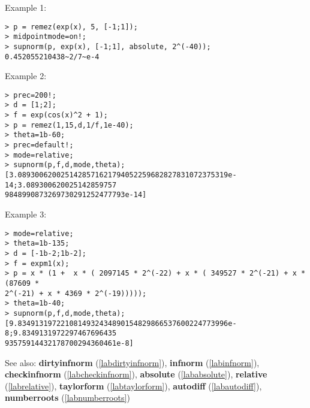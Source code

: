 \noindent Example 1: 
\begin{center}\begin{minipage}{15cm}\begin{Verbatim}[frame=single]
> p = remez(exp(x), 5, [-1;1]);
> midpointmode=on!;
> supnorm(p, exp(x), [-1;1], absolute, 2^(-40));
0.452055210438~2/7~e-4
\end{Verbatim}
\end{minipage}\end{center}
\noindent Example 2: 
\begin{center}\begin{minipage}{15cm}\begin{Verbatim}[frame=single]
> prec=200!;
> d = [1;2];
> f = exp(cos(x)^2 + 1);
> p = remez(1,15,d,1/f,1e-40);
> theta=1b-60;
> prec=default!;
> mode=relative;
> supnorm(p,f,d,mode,theta);
[3.0893006200251428571621794052259682827831072375319e-14;3.089300620025142859757
9848990873269730291252477793e-14]
\end{Verbatim}
\end{minipage}\end{center}
\noindent Example 3: 
\begin{center}\begin{minipage}{15cm}\begin{Verbatim}[frame=single]
> mode=relative;
> theta=1b-135;
> d = [-1b-2;1b-2];
> f = expm1(x);
> p = x * (1 +  x * ( 2097145 * 2^(-22) + x * ( 349527 * 2^(-21) + x * (87609 * 
2^(-21) + x * 4369 * 2^(-19))))); 
> theta=1b-40;
> supnorm(p,f,d,mode,theta);
[9.8349131972210814932434890154829866537600224773996e-8;9.8349131972297467696435
93575914432178700294360461e-8]
\end{Verbatim}
\end{minipage}\end{center}
See also: \textbf{dirtyinfnorm} (\ref{labdirtyinfnorm}), \textbf{infnorm} (\ref{labinfnorm}), \textbf{checkinfnorm} (\ref{labcheckinfnorm}), \textbf{absolute} (\ref{lababsolute}), \textbf{relative} (\ref{labrelative}), \textbf{taylorform} (\ref{labtaylorform}), \textbf{autodiff} (\ref{labautodiff}), \textbf{numberroots} (\ref{labnumberroots})
